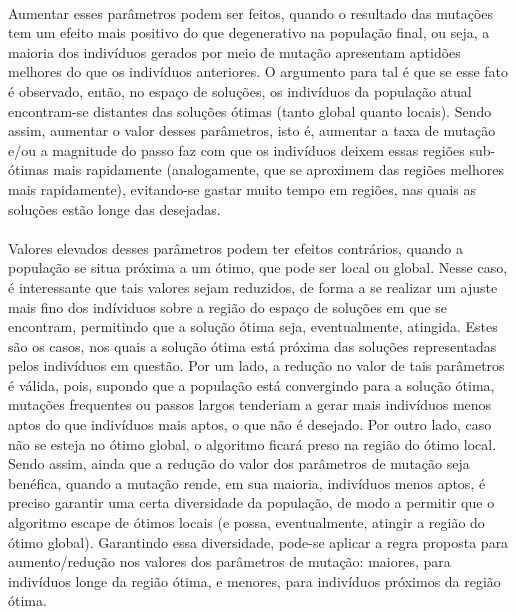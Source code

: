 \documentclass{report}
\begin{document}
\paragraph{} Aumentar esses parâmetros podem ser feitos, quando o resultado das mutações tem um efeito mais positivo do que degenerativo na população final, ou seja, a maioria dos indivíduos gerados por meio de mutação apresentam aptidões melhores do que os indivíduos anteriores. O argumento para tal é que se esse fato é observado, então, no espaço de soluções, os indivíduos da população atual encontram-se distantes das soluções ótimas (tanto global quanto locais). Sendo assim, aumentar o valor desses parâmetros, isto é, aumentar a taxa de mutação e/ou a magnitude do passo faz com que os indivíduos deixem essas regiões sub-ótimas mais rapidamente (analogamente, que se aproximem das regiões melhores mais rapidamente), evitando-se gastar muito tempo em regiões, nas quais as soluções estão longe das desejadas.\\

\paragraph{} Valores elevados desses parâmetros podem ter efeitos contrários, quando a população se situa próxima a um ótimo, que pode ser local ou global. Nesse caso, é interessante que tais valores sejam reduzidos, de forma a se realizar um ajuste mais fino dos indíviduos sobre a região do espaço de soluções em que se encontram, permitindo que a solução ótima seja, eventualmente, atingida. Estes são os casos, nos quais a solução ótima está próxima das soluções representadas pelos indivíduos em questão. Por um lado, a redução no valor de tais parâmetros é válida, pois, supondo que a população está convergindo para a solução ótima, mutações frequentes ou passos largos tenderiam a gerar mais indivíduos menos aptos do que indivíduos mais aptos, o que não é desejado. Por outro lado, caso não se esteja no ótimo global, o algoritmo ficará preso na região do ótimo local. Sendo assim, ainda que a redução do valor dos parâmetros de mutação seja benéfica, quando a mutação rende, em sua maioria, indivíduos menos aptos, é preciso garantir uma certa diversidade da população, de modo a permitir que o algoritmo escape de ótimos locais (e possa, eventualmente, atingir a região do ótimo global). Garantindo essa diversidade, pode-se aplicar a regra proposta para aumento/redução nos valores dos parâmetros de mutação: maiores, para indivíduos longe da região ótima, e menores, para indivíduos próximos da região ótima.\\
\end{document}

